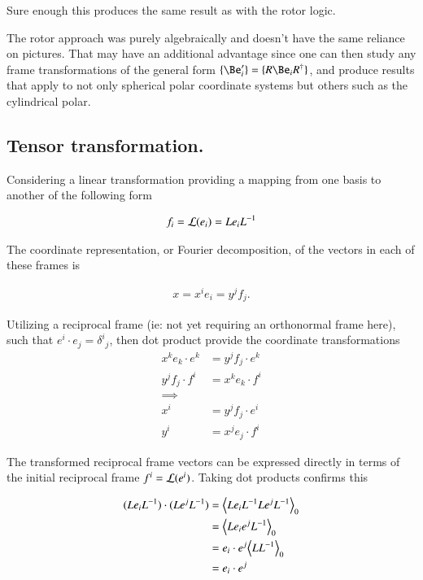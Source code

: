 Sure enough this produces the same result as with the rotor logic.

The rotor approach was purely algebraically and doesn't have
the same reliance on pictures.  That may have
an 
additional advantage
since one can then 
study any frame transformations of the general form $\{\Be_i'\} = \{ R \Be_i R^\dagger \}$, and produce results 
that apply to 
not only spherical polar coordinate systems but others such as the cylindrical polar.

\subsection{Tensor transformation. }

Considering a linear transformation providing a mapping from one basis to another of the following form

\begin{align*}
f_i = \mathcal{L}(e_i) = L e_i L^{-1}
\end{align*}

The coordinate representation, or Fourier decomposition, of the vectors in each of these frames is

\begin{align*}
x = x^i e_i = y^j f_j.
\end{align*}

Utilizing a reciprocal frame (ie: not yet requiring an orthonormal frame here), such that $e^i \cdot e_j = {\delta^i}_j$, 
then dot product provide the coordinate transformations
\begin{align*}
x^k e_k \cdot e^k &= y^j f_j \cdot e^k \\
y^j f_j \cdot f^i &= x^k e_k \cdot f^i \\
\implies \\
x^i &= y^j f_j \cdot e^i \\
y^i &= x^j e_j \cdot f^i
\end{align*}

The transformed reciprocal frame vectors can be expressed directly in terms of the initial reciprocal frame $f^i = \mathcal{L}(e^i)$.  Taking
dot products confirms this

\begin{align*}
(L e_i L^{-1}) \cdot (L e^j L^{-1}) 
&= {\left\langle{{ L e_i L^{-1} L e^j L^{-1} }}\right\rangle}_{0} \\
&= {\left\langle{{ L e_i e^j L^{-1} }}\right\rangle}_{0} \\
&= e_i \cdot e^j {\left\langle{{ L L^{-1} }}\right\rangle}_{0} \\
&= e_i \cdot e^j
\end{align*}

